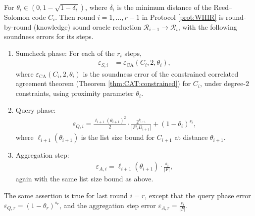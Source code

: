 \begin{thm}
\label{thm:WHIR:soundness}
For $\theta_i\in (0,1 -\sqrt{1-\delta_i})$, where $\delta_i$ is the minimum distance of the Reed--Solomon code $C_i$.
Then round $i=1,\ldots, r-1$ in Protocol \ref{prot:WHIR} is round-by-round (knowledge) sound oracle reduction $\mathcal R_{i-1}\longrightarrow \mathcal R_{i}$, with the following soundness errors for its steps.
\begin{enumerate}
    \item 
    Sumcheck phase:
    For each of the $r_i$ steps,
    \begin{align*}
       \varepsilon_{S,i} &= \varepsilon_{\text{CA}}(C_{i},2,\theta_{i}), 
    \end{align*}
    where $\varepsilon_\text{CA}(C_{i},2,\theta_{i})$ is the soundness error of the constrained correlated agreement theorem (Theorem \ref{thm:CAT:constrained}) for $C_{i}$, under degree-$2$ constraints, using proximity parameter $\theta_{i}$.
    \item 
    Query phase:
    \begin{align*}
        \varepsilon_{Q,i} = \frac{\ell_{i+1}(\theta_{i+1})^2}{2} \cdot \frac{2^{k_{i+1}}}{|F\setminus D_{i+1}|} + (1 -\theta_{i})^{s_i},
    \end{align*}
    where $\ell_{i+1}(\theta_{i+1})$ is the list size bound for $C_{i+1}$ at distance $\theta_{i+1}$.
    \item 
    Aggregation step:
    \begin{align*}
        \varepsilon_{A,i} = \ell_{i+1}(\theta_{i+1}) \cdot \frac{s_{i}}{|F|},
    \end{align*}
    again with the same list size bound as above.
\end{enumerate}
The same assertion is true for last round $i=r$, except that the query phase error $\varepsilon_{Q,r} = (1 - \theta_r)^{s_r}$, and the aggregation step error $\varepsilon_{A,r} = \frac{s_i}{|F|}$.
\end{thm}




